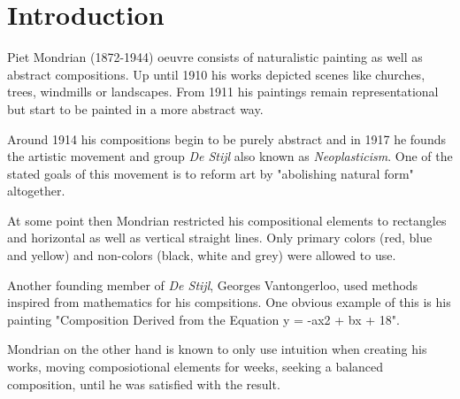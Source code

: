 \section{Introduction}

Piet Mondrian (1872-1944) oeuvre consists of naturalistic painting as well
as abstract compositions. Up until 1910 his works depicted scenes like
churches, trees, windmills or landscapes. From 1911 his paintings
remain representational but start to be painted in a more abstract way.

Around 1914 his compositions begin to be purely abstract and in 1917 he founds
the artistic movement and group \textit{De Stijl} also known as
\textit{Neoplasticism}. One of the stated goals of this movement is to reform
art by "abolishing natural form" \cite{wiki:manifest} altogether.


At some point then Mondrian restricted his compositional elements to rectangles
and horizontal as well as vertical straight lines. Only primary colors (red,
blue and yellow) and non-colors (black, white and grey) were allowed to use.

Another founding member of \textit{De Stijl}, Georges Vantongerloo, used methods
inspired from mathematics for his compsitions. One obvious example of this is
his painting "Composition Derived from the Equation y = -ax2 + bx + 18".

Mondrian on the other hand is known to only use intuition when creating his
works, moving composiotional elements for weeks, seeking a balanced composition,
until he was satisfied with the result. %








